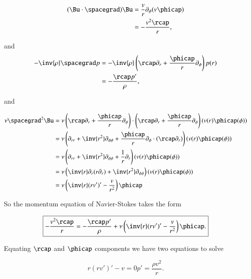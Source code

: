 \begin{align*}
(\Bu \cdot \spacegrad) \Bu
&=
\frac{ v}{r} \partial_\phi  ( v \phicap ) \\
&=
-\frac{ v^2 \rcap}{r},
\end{align*}

and
\begin{align*}
-\inv{\rho} \spacegrad p
&=
-\inv{\rho} \left( \rcap \partial_r + \frac{\phicap}{r} \partial_\phi \right) p(r) \\
&=
-\frac{\rcap p'}{\rho},
\end{align*}

and 

\begin{align*}
\nu \spacegrad^2 \Bu
&=
\nu 
\left( \rcap \partial_r + \frac{\phicap}{r} \partial_\phi \right) \cdot
\left( \rcap \partial_r + \frac{\phicap}{r} \partial_\phi \right) 
(v(r) \phicap(\phi)) \\
&=
\nu 
\left( 
\partial_{rr} + \inv{r^2} \partial_{\phi\phi}
+ 
\frac{\phicap}{r} \partial_\phi \cdot (\rcap \partial_r)
\right)
(v(r) \phicap(\phi)) \\
&=
\nu 
\left( 
\partial_{rr} + \inv{r^2} \partial_{\phi\phi}
+ 
\frac{1}{r} \partial_r
\right)
(v(r) \phicap(\phi)) \\
&=
\nu 
\left( 
\inv{r} \partial_{r} (r \partial_r) + \inv{r^2} \partial_{\phi\phi}
\right)
(v(r) \phicap(\phi)) \\
&=
\nu 
\left( 
\inv{r} (r v')' - \frac{v}{r^2} 
\right)
\phicap
\end{align*}

So the momentum equation of Navier-Stokes takes the form

\begin{equation}\label{eqn:couetteFlow:1310}
\boxed{
-\frac{ v^2 \rcap}{r} =
-\frac{\rcap p'}{\rho}
+
\nu 
\left( 
\inv{r} (r v')' - \frac{v}{r^2} 
\right)
\phicap.
}
\end{equation}

Equating $\rcap$ and $\phicap$ components we have two equations to solve

\begin{subequations}
\begin{equation}\label{eqn:couetteFlow:130}
r (r v')' - v = 0
\end{equation}
\begin{equation}\label{eqn:couetteFlow:150}
p' = \frac{\rho v^2}{r}.
\end{equation}
\end{subequations}


